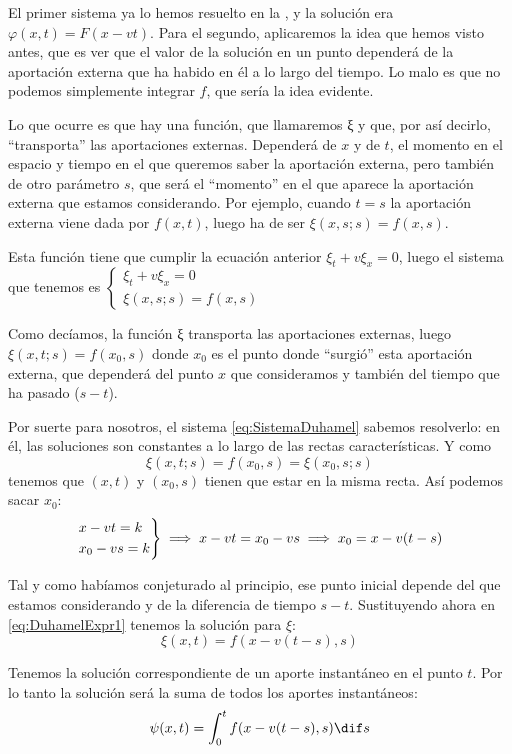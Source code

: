 			El primer sistema ya lo hemos resuelto en la , y la solución era ${φ(x,t) = F(x - vt)}$. Para el segundo, aplicaremos la idea que hemos visto antes, que es ver que el valor de la solución en un punto dependerá de la aportación externa que ha habido en él a lo largo del tiempo. Lo malo es que no podemos simplemente integrar $f$, que sería la idea evidente.

			Lo que ocurre es que hay una función, que llamaremos ξ y que, por así decirlo, ``transporta'' las aportaciones externas. Dependerá de $x$ y de $t$, el momento en el espacio y tiempo en el que queremos saber la aportación externa, pero también de otro parámetro $s$, que será el ``momento'' en el que aparece la aportación externa que estamos considerando. Por ejemplo, cuando $t = s$ la aportación externa viene dada por $f(x,t)$, luego ha de ser $ξ(x,s; s) = f(x,s)$.

			Esta función tiene que cumplir la ecuación anterior $ξ_t + v ξ_x = 0$, luego el sistema que tenemos es \( \begin{cases}
			ξ_t + vξ_x = 0 \\
			ξ(x,s;s) = f(x,s)
			\end{cases} \label{eq:SistemaDuhamel} \)

			Como decíamos, la función ξ transporta las aportaciones externas, luego \( ξ(x,t; s) = f(x_0, s) \label{eq:DuhamelExpr1} \) donde $x_0$ es el punto donde ``surgió'' esta aportación externa, que dependerá del punto $x$ que consideramos y también del tiempo que ha pasado ($s-t$).

			Por suerte para nosotros, el sistema \eqref{eq:SistemaDuhamel} sabemos resolverlo: en él, las soluciones son constantes a lo largo de las rectas características. Y como $$ξ(x,t;s) = f(x_0, s) = ξ(x_0,s;s)$$ tenemos que $(x,t)$ y $(x_0, s)$ tienen que estar en la misma recta. Así podemos sacar $x_0$:
			\[
			\begin{rcases}
				x-vt = k\\
				x_0 - vs = k
			\end{rcases}
			 \implies x-vt = x_0 - vs \implies
			x_0 = x-v(t-s) \]

			Tal y como habíamos conjeturado al principio, ese punto inicial depende del que estamos considerando y de la diferencia de tiempo $s-t$. Sustituyendo ahora en \eqref{eq:DuhamelExpr1} tenemos la solución para $ξ$:
			\[ \xi(x,t) = f(x - v(t-s), s) \]

			Tenemos la solución correspondiente de un aporte instantáneo en el punto $t$. Por lo tanto la solución será la suma de todos los aportes instantáneos:
			\[  \psi(x,t) = \int^{t}_{0} f(x-v(t-s),s) \dif s \]

